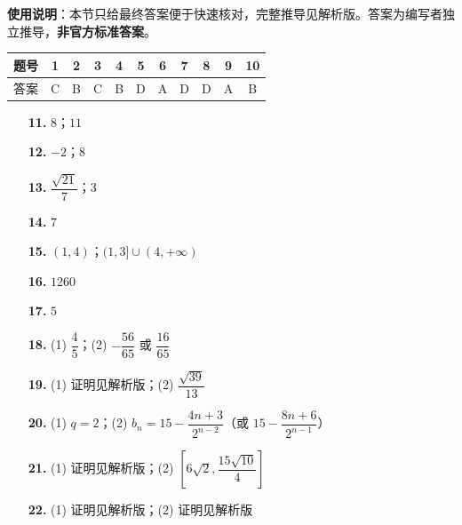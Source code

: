 
\begin{gknotice}
\textbf{使用说明}：本节只给最终答案便于快速核对，完整推导见解析版。答案为编写者独立推导，\textbf{非官方标准答案}。
\end{gknotice}

\begin{center}\begin{tabular}{ccccccccccc}
\toprule
题号 & 1 & 2 & 3 & 4 & 5 & 6 & 7 & 8 & 9 & 10 \\
\midrule
答案 & C & B & C & B & D & A & D & D & A & B \\
\bottomrule
\end{tabular}\end{center}

\begin{itemize}[leftmargin=2.6em]
  \item[\textbf{11.}] $8$；$11$
  \item[\textbf{12.}] $-2$；$8$
  \item[\textbf{13.}] $\dfrac{\sqrt{21}}{7}$；$3$
  \item[\textbf{14.}] $7$
  \item[\textbf{15.}] $(1, 4)$；$(1, 3] \cup (4, +\infty)$
  \item[\textbf{16.}] $1260$
  \item[\textbf{17.}] $5$
\end{itemize}

\begin{itemize}[leftmargin=2.6em]
  \item[\textbf{18.}] (1) $\dfrac45$；(2) $-\dfrac{56}{65}$ 或 $\dfrac{16}{65}$
  \item[\textbf{19.}] (1) 证明见解析版；(2) $\dfrac{\sqrt{39}}{13}$
  \item[\textbf{20.}] (1) $q = 2$；(2) $b_n = 15 - \dfrac{4n + 3}{2^{n-2}}$（或 $15 - \dfrac{8n + 6}{2^{n-1}}$）
  \item[\textbf{21.}] (1) 证明见解析版；(2) $\left[6\sqrt2, \dfrac{15\sqrt{10}}{4}\right]$
  \item[\textbf{22.}] (1) 证明见解析版；(2) 证明见解析版
\end{itemize}

